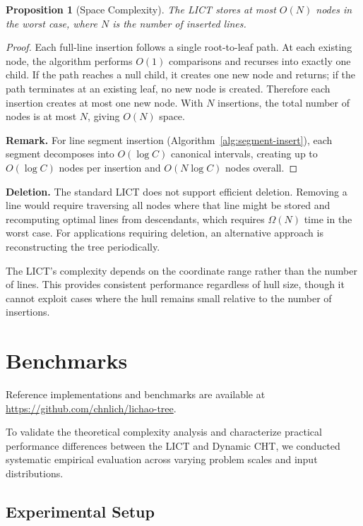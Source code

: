 \documentclass[11pt,a4paper]{article}
\theoremstyle{definition}
\theoremstyle{plain}
\newtheorem{proposition}{Proposition}
\begin{document}
\begin{proposition}[Space Complexity]\label{prop:space-complexity}
The LICT stores at most $O(N)$ nodes in the worst case, where $N$ is the number of inserted lines.
\end{proposition}

\begin{proof}
Each full-line insertion follows a single root-to-leaf path. At each existing node, the algorithm performs $O(1)$ comparisons and recurses into exactly one child. If the path reaches a null child, it creates one new node and returns; if the path terminates at an existing leaf, no new node is created. Therefore each insertion creates at most one new node. With $N$ insertions, the total number of nodes is at most $N$, giving $O(N)$ space.

\textbf{Remark.} For line segment insertion (Algorithm~\ref{alg:segment-insert}), each segment decomposes into $O(\log C)$ canonical intervals, creating up to $O(\log C)$ nodes per insertion and $O(N \log C)$ nodes overall.
\end{proof}

\textbf{Deletion.} The standard LICT does not support efficient deletion. Removing a line would require traversing all nodes where that line might be stored and recomputing optimal lines from descendants, which requires $\Omega(N)$ time in the worst case. For applications requiring deletion, an alternative approach is reconstructing the tree periodically.

The LICT's complexity depends on the coordinate range rather than the number of lines. This provides consistent performance regardless of hull size, though it cannot exploit cases where the hull remains small relative to the number of insertions.

\section{Benchmarks}\label{sec:benchmarks}

Reference implementations and benchmarks are available at \url{https://github.com/chnlich/lichao-tree}.

To validate the theoretical complexity analysis and characterize practical performance differences between the LICT and Dynamic CHT, we conducted systematic empirical evaluation across varying problem scales and input distributions.

\subsection{Experimental Setup}
\end{document}
